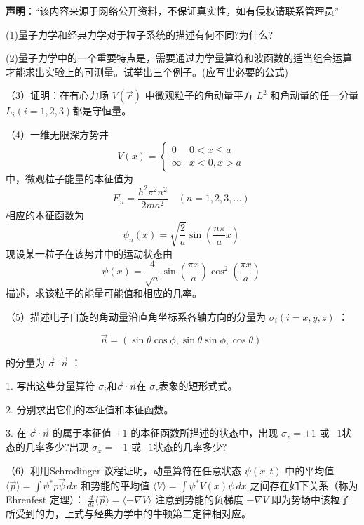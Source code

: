 
\textbf{声明}：“该内容来源于网络公开资料，不保证真实性，如有侵权请联系管理员”

(1)量子力学和经典力学对于粒子系统的描述有何不同?为什么?

(2)量子力学中的一个重要特点是，需要通过力学量算符和波函数的适当组合运算才能求出实验上的可测量。试举出三个例子。(应写出必要的公式)

（3）证明：在有心力场 $V(\vec r)$ 中微观粒子的角动量平方 $ L^2 $ 和角动量的任一分量 $L_i (i=1,2,3)$都是守恒量。

（4）一维无限深方势井
$$V(x) = 
\begin{cases} 
0 & 0 < x \leq a \\
\infty & x < 0, x > a 
\end{cases}~$$
中，微观粒子能量的本征值为
$$E_n = \frac{h^2 \pi^2 n^2}{2ma^2} \quad (n = 1, 2, 3, \ldots)~$$
相应的本征函数为
$$\psi_n(x) = \sqrt{\frac{2}{a}} \sin \left( \frac{n \pi }{a} x \right)~$$
现设某一粒子在该势井中的运动状态由
$$\psi(x) = \frac{4}{\sqrt{a}} \sin \left( \frac{\pi x}{a} \right) \cos^2 \left( \frac{\pi x}{a} \right)~$$
描述，求该粒子的能量可能值和相应的几率。

（5）描述电子自旋的角动量沿直角坐标系各轴方向的分量为 $\sigma_i (i=x,y,z)$ ：

$$\vec{n} = (\sin \theta \cos \phi, \sin \theta \sin \phi, \cos \theta)~$$

的分量为 $\vec{\sigma} \cdot \vec{n}$ ：

1. 写出这些分量算符 $\sigma_i$和$\vec{\sigma} \cdot \vec{n}$在 $\sigma_z$表象的短形式式。

2. 分别求出它们的本征值和本征函数。

3. 在 $\vec{\sigma} \cdot \vec{n}$ 的属于本征值 $+1$ 的本征函数所描述的状态中，出现 $\sigma_z = +1$ 或$-1$状态的几率多少?出现 $\sigma_x = -1$ 或$-1$状态的几率多少?

（6）利用Schrodinger 议程证明，动量算符在任意状态 $\psi(x,t)$ 中的平均值
$\langle \vec{p} \rangle = \int \psi^* p\vec{\psi}\, dx $
和势能的平均值
$\langle V \rangle = \int \psi^* V(x) \psi \, dx $
之间存在如下关系（称为Ehrenfest 定理）：
$ \frac{d}{dt} \langle \vec{p} \rangle = \langle -\nabla V \rangle $
注意到势能的负梯度 $ - \nabla V $ 即为势场中该粒子所受到的力，上式与经典力学中的牛顿第二定律相对应。